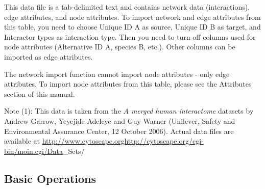  This data file is a tab-delimited text and contains network data (interactions), edge attributes, and node attributes. To import network and edge attributes from this table, you need to choose Unique ID A as source, Unique ID B as target, and Interactor types as interaction type. Then you need to turn off columns used for node attributes (Alternative ID A, species B, etc.). Other columns can be imported as edge attributes. 

 The network import function cannot import node attributes - only edge attributes. To import node attributes from this table, please see the Attributes section of this manual. 

 Note (1): This data is taken from the \emph{A merged human interactome}
 datasets by Andrew Garrow, Yeyejide Adeleye and Guy Warner (Unilever, Safety and Environmental Assurance Center, 12 October 2006). Actual data files are available at \url{http://www.cytoscape.orghttp://cytoscape.org/cgi-bin/moin.cgi/Data}\_Sets/
 
\subsection{Basic Operations}

